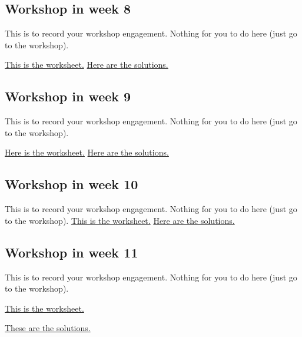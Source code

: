 \documentclass{amsart}
\begin{document}
\subsection{Workshop in week 8}
\label{sec:orga580163}
This is to record your workshop engagement.  Nothing for you to do here (just go to the workshop).

\href{https://canvas.anu.edu.au/files/844087/download?download\_frd=1\&verifier=EkBQbjevX17L6q1Q0mF2wCbE779GIP7ytJG2ojUv}{This is the worksheet.}
\href{https://canvas.anu.edu.au/files/857941/download?download\_frd=1\&verifier=BuSP6xHFqNTxcT1FM1B9t5hFApsNGIKaGDDUDFpw}{Here are the solutions.}
\subsection{Workshop in week 9}
\label{sec:orgcd8ba16}
This is to record your workshop engagement.  Nothing for you to do here (just go to the workshop).

\href{https://canvas.anu.edu.au/files/859051/download?download\_frd=1\&verifier=8Q8G0uUTuIF3HHy8S6aYTrjkWbSbugHUKRey340i}{Here is the worksheet.}
\href{https://canvas.anu.edu.au/files/1193041/download?download\_frd=1\&verifier=BDAQUW58Ri7F3lXnvxmt2S6AnqKRf8GvtQPhGyCW}{Here are the solutions.}
\subsection{Workshop in week 10}
\label{sec:orgb0e709c}
This is to record your workshop engagement.  Nothing for you to do here (just go to the workshop).
\href{https://canvas.anu.edu.au/files/1193018/download?download\_frd=1\&verifier=Fre2KybJXDQwHG7xRSxbI4dhdej5vE1xCFQZEtQU}{This is the worksheet.}
\href{https://canvas.anu.edu.au/files/1237040/download?download\_frd=1\&verifier=d5tQtEhqHdUZk1xBLoq5UQDI04e13KJgnvnGKMKS}{Here are the solutions.} 
\subsection{Workshop in week 11}
\label{sec:org9da99cb}
This is to record your workshop engagement.  Nothing for you to do here (just go to the workshop).

\href{https://canvas.anu.edu.au/files/1237035/download?download\_frd=1\&verifier=U7pZ7aIdDkAmqEpAyV1nb0EIK4P9stSaiRVIAhVP}{This is the worksheet.}

\href{https://canvas.anu.edu.au/files/1253160/download?download\_frd=1\&verifier=KAEIUuu29GLKGm09hRoWStdoSa88qcGgftvfeZds}{These are the solutions.}
\end{document}

